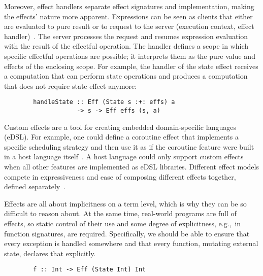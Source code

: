 \documentclass[conference]{IEEEtran}
\begin{document}
    Moreover, effect handlers separate effect signatures and implementation, making the effects' nature more apparent.
    Expressions can be seen as clients that either are evaluated to pure result or to request to the server (execution context, effect handler)~\cite{kiselyov2013extensible}.
    The server processes the request and resumes expression evaluation with the result of the effectful operation.
    The handler defines a scope in which specific effectful operations are possible; it interprets them as the pure value and effects of the enclosing scope.
    For example, the handler of the state effect receives a computation that can perform state operations and produces a computation that does not require state effect anymore:
    \begin{verbatim}
        handleState :: Eff (State s :+: effs) a
                    -> s -> Eff effs (s, a)
    \end{verbatim}

    Custom effects are a tool for creating embedded domain-specific languages (eDSL).
    For example, one could define a coroutine effect that implements a specific scheduling strategy and then use it as if the coroutine feature were built in a host language itself~\cite{leijen2017structured}.
    A host language could only support custom effects when all other features are implemented as eDSL libraries.
    Different effect models compete in expressiveness and ease of composing different effects together, defined separately~\cite{liang1995monad, kiselyov2013extensible, schrijvers2019monad, van2024framework}.

    Effects are all about implicitness on a term level, which is why they can be so difficult to reason about.
    At the same time, real-world programs are full of effects, so static control of their use and some degree of explicitness, e.g.,\ in function signatures, are required.
    Specifically, we should be able to ensure that every exception is handled somewhere and that every function, mutating external state, declares that explicitly.
    \begin{verbatim}
        f :: Int -> Eff (State Int) Int
    \end{verbatim}
\end{document}
